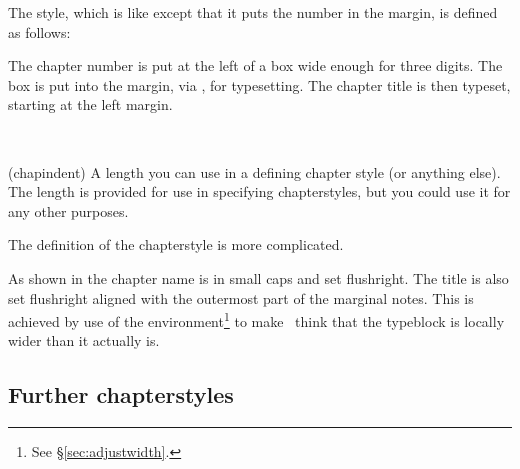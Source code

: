 The  style, which is like  except that it
puts the number in the margin, is defined as follows:
\begin{lcode}
\end{lcode}
The chapter number is put at the left of a box wide enough for three digits.
The box is put into the margin, via \cmd{\llap}, for typesetting. The
chapter title is then typeset, starting at the left margin.

\begin{syntax}
\lnc{\chapindent} \\
\end{syntax}
\glossary(chapindent)%
  {}%
  {A length you can use in a defining chapter style (or anything else).}
The length \lnc{\chapindent} is provided for use in specifying chapterstyles,
but you could use it for any other purposes.

    The definition of the  chapterstyle is more complicated.
\begin{lcode}
\end{lcode}
As shown in  the chapter name is in small caps and set
flushright. The title is also set flushright aligned with the outermost 
part of the marginal notes. This is achieved by use of the 
environment\footnote{See \S\ref{sec:adjustwidth}.} to make \ltx\ think
that the typeblock is locally wider than it actually is.

\subsection{Further chapterstyles}



